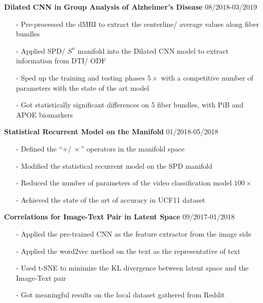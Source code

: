\documentclass[margin]{res}
\begin{document}
\begin{resume}
                \textbf{Dilated CNN in Group Analysis of Alzheimer's Disease} \hfill 08/2018-03/2019
                \begin{itemize}\itemsep -2.2pt %
                 \item[-] Pre-processed the dMRI to extract the centerline/ average values along fiber bundles
                 \item[-] Applied SPD/ $S^n$ manifold into the Dilated CNN model to extract information from DTI/ ODF
                 \item[-] Sped up the training and testing phases $5\times$ with a competitive number of parameters with the state of the art model
                 \item[-] Got statistically significant differences on 5 fiber bundles, with PiB and APOE biomarkers
                 \end{itemize}

                 \textbf{Statistical Recurrent Model on the Manifold} \hfill 01/2018-05/2018
                \begin{itemize}\itemsep -2.2pt %
                 \item[-] Defined the ``$+/\ \times$'' operators in the manifold space
                 \item[-] Modified the statistical recurrent model on the SPD manifold
                 \item[-] Reduced the number of parameters of the video classification model $100\times$
                 \item[-] Achieved the state of the art of accuracy in UCF11 dataset
                 \end{itemize}

                 \textbf{Correlations for Image-Text Pair in Latent Space} \hfill 09/2017-01/2018
                \begin{itemize}\itemsep -2.2pt %
                 \item[-] Applied the pre-trained CNN as the feature extractor from the image side 
                 \item[-] Applied the word2vec method on the text as the representative of text
                 \item[-] Used t-SNE to minimize the KL divergence between latent space and the Image-Text pair
                 \item[-] Got meaningful results on the local dataset gathered from Reddit
                 \end{itemize}


\end{resume}
\end{document}
